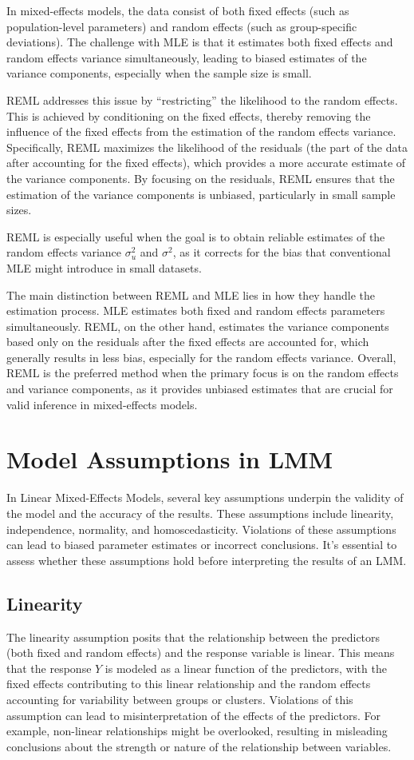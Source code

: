 In mixed-effects models, the data consist of both fixed effects (such as population-level parameters) and random effects (such as group-specific deviations). The challenge with MLE is that it estimates both fixed effects and random effects variance simultaneously, leading to biased estimates of the variance components, especially when the sample size is small.

REML addresses this issue by ``restricting'' the likelihood to the random effects. This is achieved by conditioning on the fixed effects, thereby removing the influence of the fixed effects from the estimation of the random effects variance. Specifically, REML maximizes the likelihood of the residuals (the part of the data after accounting for the fixed effects), which provides a more accurate estimate of the variance components. By focusing on the residuals, REML ensures that the estimation of the variance components is unbiased, particularly in small sample sizes.

REML is especially useful when the goal is to obtain reliable estimates of the random effects variance $\sigma_u^2$ and $\sigma^2$, as it corrects for the bias that conventional MLE might introduce in small datasets.

The main distinction between REML and MLE lies in how they handle the estimation process. MLE estimates both fixed and random effects parameters simultaneously. REML, on the other hand, estimates the variance components based only on the residuals after the fixed effects are accounted for, which generally results in less bias, especially for the random effects variance. Overall, REML is the preferred method when the primary focus is on the random effects and variance components, as it provides unbiased estimates that are crucial for valid inference in mixed-effects models.

\section{Model Assumptions in LMM}
In Linear Mixed-Effects Models, several key assumptions underpin the validity of the model and the accuracy of the results. These assumptions include linearity, independence, normality, and homoscedasticity. Violations of these assumptions can lead to biased parameter estimates or incorrect conclusions. It's essential to assess whether these assumptions hold before interpreting the results of an LMM.

\subsection*{Linearity}
The linearity assumption posits that the relationship between the predictors (both fixed and random effects) and the response variable is linear. This means that the response $Y$ is modeled as a linear function of the predictors, with the fixed effects contributing to this linear relationship and the random effects accounting for variability between groups or clusters. Violations of this assumption can lead to misinterpretation of the effects of the predictors. For example, non-linear relationships might be overlooked, resulting in misleading conclusions about the strength or nature of the relationship between variables.

